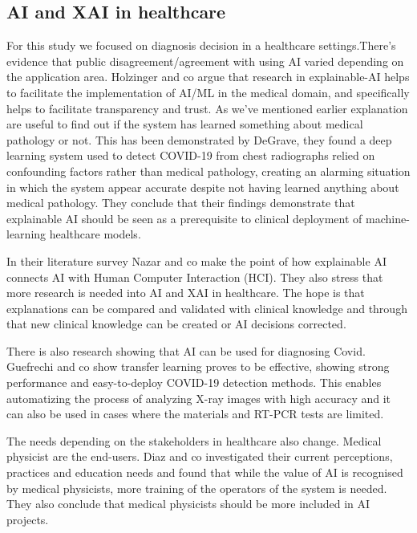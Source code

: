 \documentclass[manuscript,screen,review]{acmart}
\begin{document}
\subsection{AI and XAI in healthcare}\label{subsec:ai-in-healthcare}
For this study we focused on diagnosis decision in a healthcare settings.There's evidence that public disagreement/agreement with using AI varied depending on the application area\cite{Ikkatai2022}.
Holzinger and co argue that research in explainable-AI helps to facilitate the implementation of AI/ML in the medical domain, and specifically helps to facilitate transparency and trust\cite{Holzinger2017}.
As we've mentioned earlier explanation are useful to find out if the system has learned something about medical pathology or not.
This has been demonstrated by DeGrave, they found a deep learning system used to detect COVID-19 from chest radiographs relied on confounding factors rather than medical pathology, creating an alarming situation in which the system appear accurate despite not having learned anything about medical pathology.
They conclude that their findings demonstrate that explainable AI should be seen as a prerequisite to clinical deployment of machine-learning healthcare models\cite{DeGrave2021}.

In their literature survey Nazar and co make the point of how explainable AI connects AI with Human Computer Interaction (HCI).
They also stress that more research is needed into AI and XAI in healthcare.
The hope is that explanations can be compared and validated with clinical knowledge and through that new
clinical knowledge can be created or AI decisions corrected\cite{Nazar2021}.

There is also research showing that AI can be used for diagnosing Covid.
Guefrechi and co show transfer learning proves to be effective, showing strong performance and easy-to-deploy COVID-19 detection methods.
This enables automatizing the process of analyzing X-ray images with high accuracy and it can also be used in cases where the materials and RT-PCR tests are limited\cite{Guefrechi2021}.

The needs depending on the stakeholders in healthcare also change.
Medical physicist are the end-users.
Diaz and co investigated their current perceptions, practices and education needs and found that while the value of AI is recognised by medical physicists, more training of the operators of the system is needed.
They also conclude that medical physicists should be more included in AI projects\cite{Diaz2021}.
\end{document}
